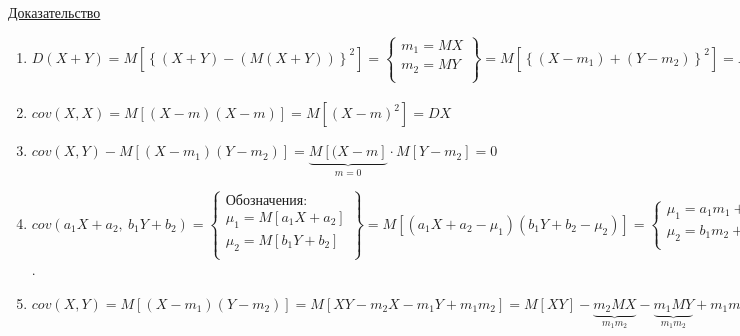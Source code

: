 \underline{Доказательство} 
\begin{enumerate}
	\item[$1^o$] $D(X + Y) = M\left[ \left\{ (X + Y) - (M(X + Y))\right\}^2 \right] = \left\{
	\begin{matrix}
		m_1 = MX \\
		m_2 = MY \\
	\end{matrix} \right\} = 
	M\left[ \left\{ (X - m_1) + (Y - m_2) \right\}^2 \right] = 
	M \left[ (X - m_1)^2 + (Y - m_2)^2 + 2M\left[ (X - m_1)(Y - m_2)\right] \right] = 
	\underbrace{M\left[(X - m_1)^2\right]}_{DX} + \underbrace{M\left[(Y - m_2)^2\right]}_{DY} + 2 \underbrace{M\left[(X - m_1)(Y - m_2)\right]}_{cov(X, Y)} = DX + DY + 2 cov(X, Y)$\\
	
	\item[$2^o$] $cov(X, X) = M\left[(X - m)(X - m)\right] = M\left[(X - m)^2\right] = DX$\\
	
	\item[$3^o$] $cov(X, Y) - M\left[(X - m_1)(Y - m_2)\right] = \underbrace{M\left[(X - m\right]}_{m = 0} \cdot M[Y - m_2] = 0$\\
	
	\item[$4^o$] $cov(a_1 X + a_2, \ b_1 Y + b_2) = \left\{
	\begin{array}{lll}
		\text{Обозначения:}\\
		\mu_1 = M[a_1 X + a_2] \\
		\mu_2 = M[b_1 Y + b_2] \\
	\end{array} \right\} = 
	M\left[(a_1 X + a_2 - \mu_1)(b_1 Y + b_2 - \mu_2)\right] = \left\{
	\begin{array}{lll}
		\mu_1 = a_1 m_1 + a_2 \\
		\mu_2 = b_1 m_2 + b_2 \\
	\end{array} \right\} = 
	M\left[(a_1 X - a_2 m_1)(b_1 Y - b_1 m_2)\right] = 
	\left\{\mu - \text{ линейно}\right\} = a_1 b_1 M\left[(X - m_1)(Y - m_2)\right] = a_1 b_1 \cdot cov(X, Y)$.\\
	
	\item[$6^o$] $cov(X,Y) = M\left[(X - m_1)(Y - m_2)\right] = M\left[XY - m_2 X - m_1 Y + m_1 m_2\right] = M[XY] - \underbrace{m_2 MX}_{m_1 m_2} - \underbrace{m_1 MY}_{m_1 m_2} + m_1 m_2 = M[XY] - m_1 m_2$\\
	

\end{enumerate}
